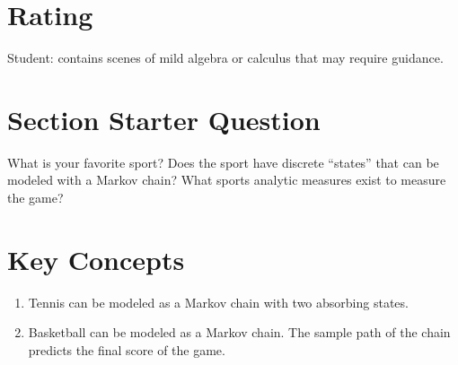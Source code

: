 \documentclass[12pt]{article}
\begin{document}
\myheader \mytitle

\hr


\hr

\usefirefox

\hr



\section*{Rating} %
Student:  contains scenes of mild algebra or calculus that may require
guidance.

\hr

\section*{Section Starter Question}

What is your favorite sport?  Does the sport have discrete ``states''
that can be modeled with a Markov chain?  What sports analytic measures
exist to measure the game?

\hr

\section*{Key Concepts}

\begin{enumerate}
    \item
        Tennis can be modeled as a Markov chain with two absorbing
        states.
    \item
        Basketball can be modeled as a Markov chain.  The sample path of
        the chain predicts the final score of the game.
\end{enumerate}
\end{document}
